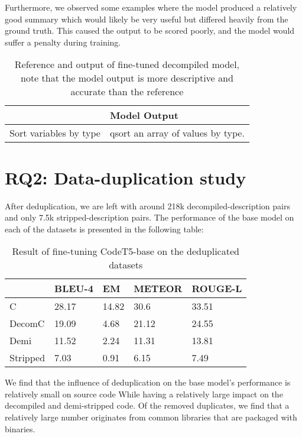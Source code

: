 Furthermore, we observed some examples where the model produced a relatively good summary which would likely be very useful but differed heavily from the ground truth. This caused the output to be scored poorly, and the model would suffer a penalty during training.

\begin{table}[!h]
\centering
\begin{tabular}{ll}
\hline
\rowcolor[HTML]{9B9B9B} 
\multicolumn{1}{|l}{\cellcolor[HTML]{9B9B9B}Reference} & \multicolumn{1}{l|}{\cellcolor[HTML]{9B9B9B}Model Output} \\ \hline
Sort variables by type                                 & qsort an array of values by type.       
\end{tabular}
\caption{Reference and output of fine-tuned decompiled model, note that the model output is more descriptive and accurate than the reference}
\label{tab:betterOutput}
\end{table}


\section{RQ2: Data-duplication study}
After deduplication, we are left with around 218k decompiled-description pairs and only 7.5k stripped-description pairs. The performance of the base model on each of the datasets is presented in the following table:

\begin{table}[!h]
\centering
\begin{tabular}{lllll} 
\hline
\rowcolor[rgb]{0.749,0.749,0.749} \multicolumn{1}{|l}{\textbf{Deduplicated}} & BLEU-4 & EM    & METEOR & \multicolumn{1}{l|}{ROUGE-L}  \\ 
\hline
C                                                                            & 28.17  & 14.82 & 30.6  &  33.51                             \\
DecomC                                                                       & 19.09  & 4.68  & 21.12  &  24.55                             \\
Demi                                                                         & 11.52  & 2.24  & 11.31  &  13.81
                             \\
Stripped                                                                     & 7.03   & 0.91  & 6.15  &  7.49                            
\end{tabular}
\caption{Result of fine-tuning CodeT5-base on the deduplicated datasets}
\label{tab:deduplicated}
\end{table}
We find that the influence of deduplication on the base model's performance is relatively small on source code While having a relatively large impact on the decompiled and demi-stripped code. 
Of the removed duplicates, we find that a relatively large number originates from common libraries that are packaged with binaries. 

